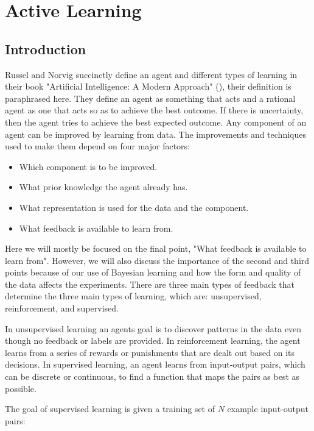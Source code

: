 \chapter{Active Learning}



\section{Introduction}
Russel and Norvig succinctly define an agent and different types of learning in their book "Artificial Intelligence: A Modern Approach" (\cite{russell2009artificial}), their definition is paraphrased here. They define an agent as something that acts and a rational agent as one that acts so as to achieve the best outcome. If there is uncertainty, then the agent tries to achieve the best expected outcome. Any component of an agent can be improved by learning from data. The improvements and techniques used to make them depend on four major factors:

\begin{itemize}
  \item Which component is to be improved.
  \item What prior knowledge the agent already has.
  \item What representation is used for the data and the component.
  \item What feedback is available to learn from.  
\end{itemize}

Here we will mostly be focused on the final point, "What feedback is available to learn from". However, we will also discuss the importance of the second and third points because of our use of Bayesian learning and how the form and quality of the data affects the experiments. There are three main types of feedback that determine the three main types of learning, which are: unsupervised, reinforcement, and supervised. 

In unsupervised learning an agents goal is to discover patterns in the data even though no feedback or labels are provided. In reinforcement learning, the agent learns from a series of rewards or punishments that are dealt out based on its decisions. In supervised learning, an agent learns from input-output pairs, which can be discrete or continuous, to find a function that maps the pairs as best as possible. 

The goal of supervised learning is given a training set of $N$ example input-output pairs:


